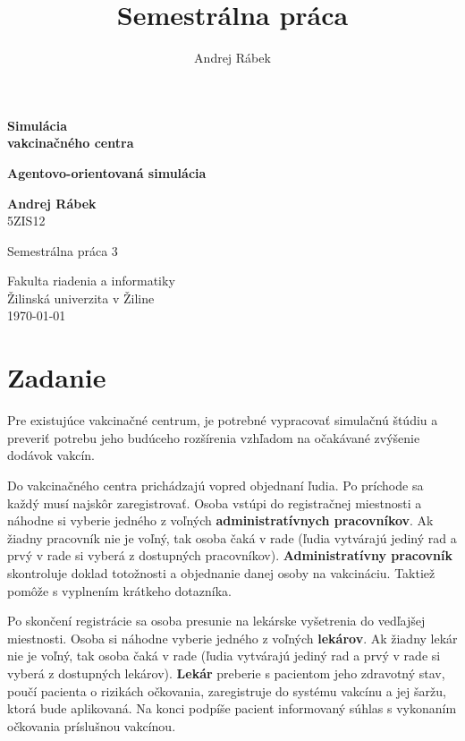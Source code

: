 \documentclass[letterpaper]{article}
\title{Semestrálna práca}
\author{Andrej Rábek}
\let\stdsection\section							%
\renewcommand\section{\newpage\stdsection}		%
\begin{document}
	\begin{titlepage}
		\begin{center}
			\vspace*{1cm}
			
			\Huge
			\textbf{Simulácia\\vakcinačného centra}
			
			\LARGE
			\textbf{Agentovo-orientovaná simulácia}
			
			\vspace{1.5cm}
			
			\textbf{Andrej Rábek}\\
			5ZIS12
			
			\vfill
			
			Semestrálna práca 3
			
			\vspace{0.8cm}
			
			\Large
			Fakulta riadenia a informatiky\\
			Žilinská univerzita v Žiline\\
			\today
			
		\end{center}
	\end{titlepage}
	
	\tableofcontents
	
	\section{Zadanie}
	
	Pre existujúce vakcinačné centrum, je potrebné vypracovať simulačnú štúdiu a preveriť potrebu jeho budúceho rozšírenia vzhľadom na očakávané zvýšenie dodávok vakcín. 
	
	Do vakcinačného centra prichádzajú vopred objednaní ľudia. Po príchode sa každý musí najskôr zaregistrovať. Osoba vstúpi do registračnej miestnosti a náhodne si vyberie jedného z voľných \textbf{administratívnych pracovníkov}. Ak žiadny pracovník nie je voľný, tak osoba čaká v rade (ľudia vytvárajú jediný rad a prvý v rade si vyberá z dostupných pracovníkov). \textbf{Administratívny pracovník} skontroluje doklad totožnosti a objednanie danej osoby na vakcináciu. Taktiež pomôže s vyplnením krátkeho dotazníka. 
	
	Po skončení registrácie sa osoba presunie na lekárske vyšetrenia do vedľajšej miestnosti. Osoba si náhodne vyberie jedného z voľných \textbf{lekárov}. Ak žiadny lekár nie je voľný, tak osoba čaká v rade (ľudia vytvárajú jediný rad a prvý v rade si vyberá z dostupných lekárov). \textbf{Lekár} preberie s pacientom jeho zdravotný stav, poučí pacienta o rizikách očkovania, zaregistruje do systému vakcínu a jej šaržu, ktorá bude aplikovaná. Na konci podpíše pacient informovaný súhlas s vykonaním očkovania príslušnou vakcínou.
	
\end{document}
